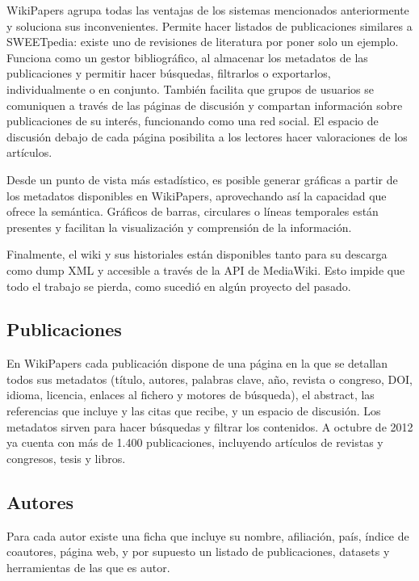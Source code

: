 \documentclass[twoside]{article}
\begin{document}
\begin{multicols}{2}
WikiPapers agrupa todas las ventajas de los sistemas mencionados anteriormente y soluciona sus inconvenientes. Permite hacer listados de publicaciones similares a SWEETpedia: existe uno de revisiones de literatura por poner solo un ejemplo. Funciona como un gestor bibliogr\'{a}fico, al almacenar los metadatos de las publicaciones y permitir hacer b\'{u}squedas, filtrarlos o exportarlos, individualmente o en conjunto. Tambi\'{e}n facilita que grupos de usuarios se comuniquen a trav\'{e}s de las p\'{a}ginas de discusi\'{o}n y compartan informaci\'{o}n sobre publicaciones de su inter\'{e}s, funcionando como una red social. El espacio de discusi\'{o}n debajo de cada p\'{a}gina posibilita a los lectores hacer valoraciones de los art\'{i}culos.

Desde un punto de vista m\'{a}s estad\'{i}stico, es posible generar gr\'{a}ficas a partir de los metadatos disponibles en WikiPapers, aprovechando as\'{i} la capacidad que ofrece la sem\'{a}ntica. Gr\'{a}ficos de barras, circulares o l\'{i}neas temporales est\'{a}n presentes y facilitan la visualizaci\'{o}n y comprensi\'{o}n de la informaci\'{o}n.

Finalmente, el wiki y sus historiales est\'{a}n disponibles tanto para su descarga como dump XML y accesible a trav\'{e}s de la API de MediaWiki. Esto impide que todo el trabajo se pierda, como sucedi\'{o} en alg\'{u}n proyecto del pasado.

\subsection{Publicaciones}
En WikiPapers cada publicaci\'{o}n dispone de una p\'{a}gina en la que se detallan todos sus metadatos (t\'{i}tulo, autores, palabras clave, a\~{n}o, revista o congreso, DOI, idioma, licencia, enlaces al fichero y motores de b\'{u}squeda), el abstract, las referencias que incluye y las citas que recibe, y un espacio de discusi\'{o}n. Los metadatos sirven para hacer b\'{u}squedas y filtrar los contenidos. A octubre de 2012 ya cuenta con m\'{a}s de 1.400 publicaciones, incluyendo art\'{i}culos de revistas y congresos, tesis y libros.

\subsection{Autores}
Para cada autor existe una ficha que incluye su nombre, afiliaci\'{o}n, pa\'{i}s, \'{i}ndice de coautores, p\'{a}gina web, y por supuesto un listado de publicaciones, datasets y herramientas de las que es autor.


\end{multicols}
\end{document}
